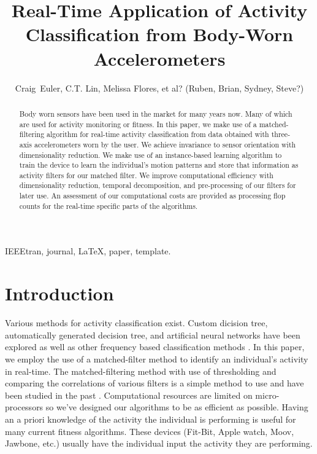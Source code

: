 \documentclass[journal]{IEEEtran}
\begin{document}
%
\title{Real-Time Application of Activity Classification from Body-Worn Accelerometers}
%
\author{Craig~Euler, C.T. Lin, Melissa Flores, et al? (Ruben, Brian, Sydney, Steve?)}
%
\maketitle
%
\begin{abstract}
Body worn sensors have been used in the market for many years now. Many of which are used for activity monitoring or fitness. In this paper, we make use of a matched-filtering algorithm for real-time activity classification from data obtained with three-axis accelerometers worn by the user. We achieve invariance to sensor orientation with dimensionality reduction. We make use of an instance-based learning algorithm to train the device to learn the individual's motion patterns and store that information as activity filters for our matched filter. We improve computational efficiency with dimensionality reduction, temporal decomposition, and pre-processing of our filters for later use. An assessment of our computational costs are provided as processing flop counts for the real-time specific parts of the algorithms.
\end{abstract}
%
\begin{IEEEkeywords}
IEEEtran, journal, \LaTeX, paper, template.
\end{IEEEkeywords}
\IEEEpeerreviewmaketitle
%
\section{Introduction}
Various methods for activity classification exist. Custom dicision tree, automatically generated decision tree, and artificial neural networks \cite{parkka_ermes_korpipaa_mantyjarvi_peltola_korhonen_2006} have been explored as well as other frequency based classification methods \cite{sharma_purwar_lee_lee_chung_2008}. In this paper, we employ the use of a matched-filter method to identify an individual’s activity in real-time. The matched-filtering method with use of thresholding and comparing the correlations of various filters is a simple method to use and have been studied in the past \cite{giannakis_tsatsanis_1990}. Computational resources are limited on micro-processors so we've designed our algorithms to be as efficient as possible. Having an a priori knowledge of the activity the individual is performing is useful for many current fitness algorithms. These devices (Fit-Bit, Apple watch, Moov, Jawbone, etc.) usually have the individual input the activity they are performing.
%
\end{document}
